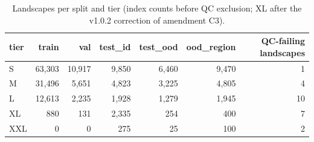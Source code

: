 \begin{table}[tb]
\centering
\small
\setlength{\tabcolsep}{3.5pt}
\caption{Landscapes per split and tier (index counts before QC exclusion; XL after the v1.0.2 correction of amendment C3).}
\label{tab:splits}
\begin{tabular}{lrrrrrr}
\toprule
tier & train & val & test\_id & test\_ood & ood\_region & QC-failing landscapes \\
\midrule
S & 63,303 & 10,917 & 9,850 & 6,460 & 9,470 & 1 \\
M & 31,496 & 5,651 & 4,823 & 3,225 & 4,805 & 4 \\
L & 12,613 & 2,235 & 1,928 & 1,279 & 1,945 & 10 \\
XL & 880 & 131 & 2,335 & 254 & 400 & 7 \\
XXL & 0 & 0 & 275 & 25 & 100 & 2 \\
\bottomrule
\end{tabular}
\end{table}
